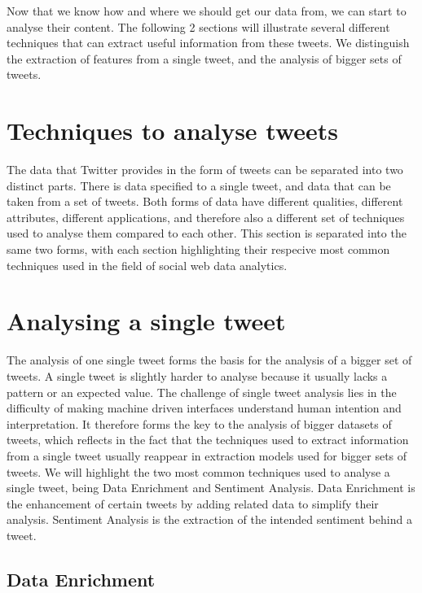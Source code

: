 \documentclass{article}
\begin{document}
Now that we know how and where we should get our data from, we can start to analyse their content. The following 2 sections will illustrate
several different techniques that can extract useful information from these tweets. We distinguish the extraction of features from a single tweet,
and the analysis of bigger sets of tweets.

\section{Techniques to analyse tweets}


The data that Twitter provides in the form of tweets can be separated into two distinct parts. There is data specified to a single tweet, 
and data that can be taken from a set of tweets. Both forms of data have different qualities, different attributes, different applications, and therefore
also a different set of techniques used to analyse them compared to each other. This section is separated into the same two forms, with each section
highlighting their respecive most common techniques used in the field of social web data analytics.

\section*{Analysing a single tweet}

The analysis of one single tweet forms the basis for the analysis of a bigger set of tweets. A single tweet is slightly harder to analyse because it usually
lacks a pattern or an expected value. The challenge of single tweet analysis lies in the difficulty of making machine driven interfaces understand human
intention and interpretation. It therefore forms the key to the analysis of bigger datasets of tweets, which reflects in the fact that the techniques used 
to extract information from a single tweet usually reappear in extraction models used for bigger sets of tweets. 
We will highlight the two most common techniques used to analyse a single tweet, being Data Enrichment and Sentiment Analysis. Data Enrichment is the
enhancement of certain tweets by adding related data to simplify their analysis. Sentiment Analysis is the extraction of the intended sentiment behind a tweet.

\subsection{Data Enrichment}
\end{document}
